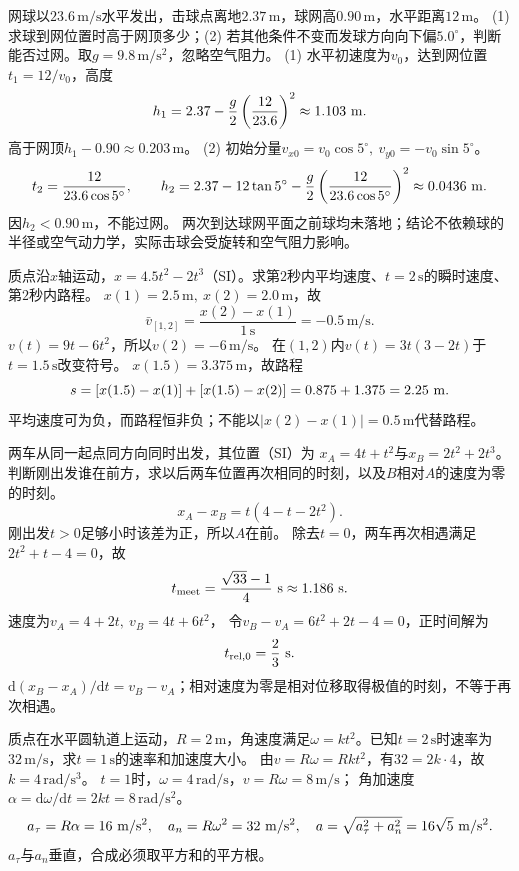 \problemtext 网球以$23.6\,\mathrm{m/s}$水平发出，击球点离地$2.37\,\mathrm m$，球网高$0.90\,\mathrm m$，水平距离$12\,\mathrm m$。
(1) 求球到网位置时高于网顶多少；(2) 若其他条件不变而发球方向向下偏$5.0^\circ$，判断能否过网。取$g=9.8\,\mathrm{m/s^2}$，忽略空气阻力。
\workings
(1) 水平初速度为$v_0$，达到网位置$t_1=12/v_0$，高度
\[
h_1=2.37-\frac{g}{2}\left(\frac{12}{23.6}\right)^2
\approx1.103\ {\rm m}.
\]
高于网顶$h_1-0.90\approx0.203\,\mathrm m$。
(2) 初始分量$v_{x0}=v_0\cos5^\circ,\ v_{y0}=-v_0\sin5^\circ$。
\[
t_2=\frac{12}{23.6\cos5^\circ},\qquad
h_2=2.37-12\tan5^\circ
-\frac{g}{2}\left(\frac{12}{23.6\cos5^\circ}\right)^2
\approx0.0436\ {\rm m}.
\]
因$h_2<0.90\,\mathrm m$，不能过网。
\crosscheck 两次到达球网平面之前球均未落地；结论不依赖球的半径或空气动力学，实际击球会受旋转和空气阻力影响。

\problemtext 质点沿$x$轴运动，$x=4.5t^2-2t^3$（SI）。求第$2$秒内平均速度、$t=2\,\mathrm s$的瞬时速度、第$2$秒内路程。
\workings
$x(1)=2.5\,\mathrm m,\ x(2)=2.0\,\mathrm m$，故
\[
\bar v_{[1,2]}=\frac{x(2)-x(1)}{1\,\mathrm s}
=-0.5\,\mathrm{m/s}.
\]
$v(t)=9t-6t^2$，所以$v(2)=-6\,\mathrm{m/s}$。
在$(1,2)$内$v(t)=3t(3-2t)$于$t=1.5\,\mathrm s$改变符号。
$x(1.5)=3.375\,\mathrm m$，故路程
\[
s=[x(1.5)-x(1)]+[x(1.5)-x(2)]
=0.875+1.375=2.25\ {\rm m}.
\]
\crosscheck 平均速度可为负，而路程恒非负；不能以$|x(2)-x(1)|=0.5\,\mathrm m$代替路程。

\problemtext 两车从同一起点同方向同时出发，其位置（SI）为
$x_A=4t+t^2$与$x_B=2t^2+2t^3$。判断刚出发谁在前方，求以后两车位置再次相同的时刻，以及$B$相对$A$的速度为零的时刻。
\workings
\[
x_A-x_B=t(4-t-2t^2).
\]
刚出发$t>0$足够小时该差为正，所以$A$在前。
除去$t=0$，两车再次相遇满足$2t^2+t-4=0$，故
\[
t_{\rm meet}=\frac{\sqrt{33}-1}{4}\ {\rm s}\approx1.186\ {\rm s}.
\]
速度为$v_A=4+2t,\ v_B=4t+6t^2$，
令$v_B-v_A=6t^2+2t-4=0$，正时间解为
\[
t_{\rm rel,0}=\frac23\ {\rm s}.
\]
\crosscheck $\mathrm d(x_B-x_A)/\mathrm dt=v_B-v_A$；相对速度为零是相对位移取得极值的时刻，不等于再次相遇。

\problemtext 质点在水平圆轨道上运动，$R=2\,\mathrm m$，角速度满足$\omega=kt^2$。已知$t=2\,\mathrm s$时速率为$32\,\mathrm{m/s}$，求$t=1\,\mathrm s$的速率和加速度大小。
\workings
由$v=R\omega=Rkt^2$，有$32=2k\cdot4$，故$k=4\,\mathrm{rad/s^3}$。
$t=1$时，$\omega=4\,\mathrm{rad/s}$，$v=R\omega=8\,\mathrm{m/s}$；
角加速度$\alpha=\mathrm d\omega/\mathrm dt=2kt=8\,\mathrm{rad/s^2}$。
\[
a_\tau=R\alpha=16\ {\rm m/s^2},\quad
a_n=R\omega^2=32\ {\rm m/s^2},\quad
a=\sqrt{a_\tau^2+a_n^2}=16\sqrt5\ {\rm m/s^2}.
\]
\crosscheck $a_\tau$与$a_n$垂直，合成必须取平方和的平方根。


